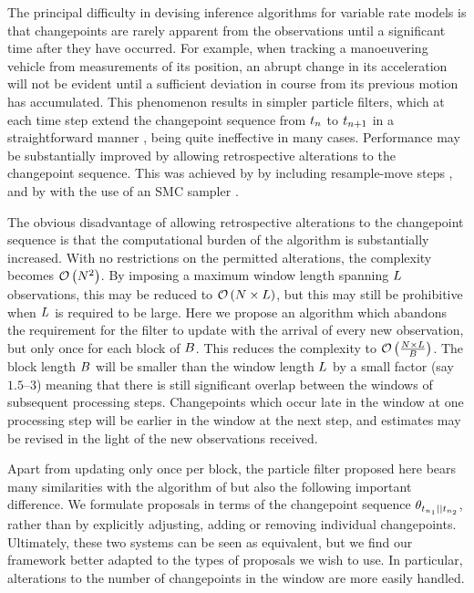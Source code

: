 \documentclass{article}
\begin{document}
The principal difficulty in devising inference algorithms for variable rate models is that changepoints are rarely apparent from the observations until a significant time after they have occurred. For example, when tracking a manoeuvering vehicle from measurements of its position, an abrupt change in its acceleration will not be evident until a sufficient deviation in course from its previous motion has accumulated. This phenomenon results in simpler particle filters, which at each time step extend the changepoint sequence from $t_{n}$ to $t_{n+1}$ in a straightforward manner \citep{Godsill2004a,Godsill2007}, being quite ineffective in many cases. Performance may be substantially improved by allowing retrospective alterations to the changepoint sequence. This was achieved by \citet{Bunch2013} by including resample-move steps \citep{Gilks2001}, and by \citet{Whiteley2011} with the use of an SMC sampler \citep{DelMoral2006,Doucet2006}.

The obvious disadvantage of allowing retrospective alterations to the changepoint sequence is that the computational burden of the algorithm is substantially increased. With no restrictions on the permitted alterations, the complexity becomes $\mathcal{O}\left({N^2}\right)$. By imposing a maximum window length spanning $L$ observations, this may be reduced to $\mathcal{O}\left({N \times L}\right)$, but this may still be prohibitive when $L$ is required to be large. Here we propose an algorithm which abandons the requirement for the filter to update with the arrival of every new observation, but only once for each block of $B$. This reduces the complexity to $\mathcal{O}\left({\frac{N \times L}{B}}\right)$. The block length $B$ will be smaller than the window length $L$ by a small factor (say $1.5$--$3$) meaning that there is still significant overlap between the windows of subsequent processing steps. Changepoints which occur late in the window at one processing step will be earlier in the window at the next step, and estimates may be revised in the light of the new observations received.

Apart from updating only once per block, the particle filter proposed here bears many similarities with the algorithm of \citet{Whiteley2011} but also the following important difference. We formulate proposals in terms of the changepoint sequence $\cp[\ot{\ti_1}]{\ot{\ti_2}}$, rather than by explicitly adjusting, adding or removing individual changepoints. Ultimately, these two systems can be seen as equivalent, but we find our framework better adapted to the types of proposals we wish to use. In particular, alterations to the number of changepoints in the window are more easily handled.
\end{document}
